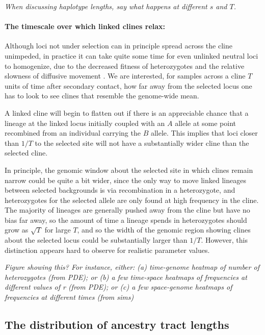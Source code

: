 \documentclass[11pt,letterpaper]{article}
\newcommand{\plr}[1]{{\em \color{blue} #1}}
\begin{document}
\plr{When discussing haplotype lengths, say what happens at different $s$ and $T$.}

\paragraph{The timescale over which linked clines relax:}
Although loci not under selection can in principle spread across the cline unimpeded,
in practice it can take quite some time for even unlinked neutral loci to homogenize,
due to the decreased fitness of heterozygotes \citep{Barton1986}
and the relative slowness of diffusive movement \citep{Sedghifar2015}.
We are interested, for samples across a cline $T$ units of time after secondary contact, how far away from the selected locus one has to look to see clines that resemble the genome-wide mean.


A linked cline will begin to flatten out if there is an appreciable chance that a lineage at the linked locus initially coupled with an $A$ allele 
at some point recombined from an individual carrying the $B$ allele.
This implies that loci closer than $1/T$ to the selected site will not have a substantially wider cline than the selected cline.

In principle, the genomic window about the selected site
in which clines remain narrow could be quite a bit wider,
since the only way to move linked lineages between selected backgrounds is via recombination in a heterozygote,
and heterozygotes for the selected allele are only found at high frequency in the cline.
The majority of lineages are generally pushed away from the cline but have no bias far away,
so the amount of time a lineage spends in heterozygotes should grow as $\sqrt{T}$ for large $T$,
and so the width of the genomic region showing clines about the selected locus could be 
substantially larger than $1/T$. However, this distinction appears hard to observe for realistic parameter values.



\plr{Figure showing this? 
    For instance, either: (a) time-genome heatmap of number of heterozygotes (from PDE);
    or (b) a few time-space heatmaps of frequencies at different values of r (from PDE);
    or (c) a few space-genome heatmaps of frequencies at different times (from sims)
}



\subsection*{The distribution of ancestry tract lengths}
\end{document}
